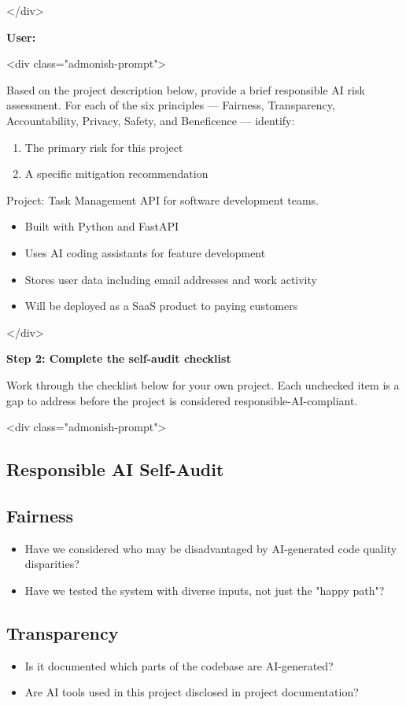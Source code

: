 \documentclass[11pt,a4paper]{book}
\begin{document}
</div>

\textbf{User:}

<div class="admonish-prompt">

Based on the project description below, provide a brief responsible AI risk assessment.
For each of the six principles --- Fairness, Transparency, Accountability, Privacy,
Safety, and Beneficence --- identify:

\begin{enumerate}
  \item The primary risk for this project
  \item A specific mitigation recommendation
\end{enumerate}

Project:
Task Management API for software development teams.
\begin{itemize}
  \item Built with Python and FastAPI
  \item Uses AI coding assistants for feature development
  \item Stores user data including email addresses and work activity
  \item Will be deployed as a SaaS product to paying customers
\end{itemize}

</div>

\textbf{Step 2: Complete the self-audit checklist}

Work through the checklist below for your own project. Each unchecked item is a gap to address before the project is considered responsible-AI-compliant.

<div class="admonish-prompt">

\subsection{Responsible AI Self-Audit}

\subsection{Fairness}
\begin{itemize}
  \item [ ] Have we considered who may be disadvantaged by AI-generated code quality disparities?
  \item [ ] Have we tested the system with diverse inputs, not just the "happy path"?
\end{itemize}

\subsection{Transparency}
\begin{itemize}
  \item [ ] Is it documented which parts of the codebase are AI-generated?
  \item [ ] Are AI tools used in this project disclosed in project documentation?
\end{itemize}
\end{document}
